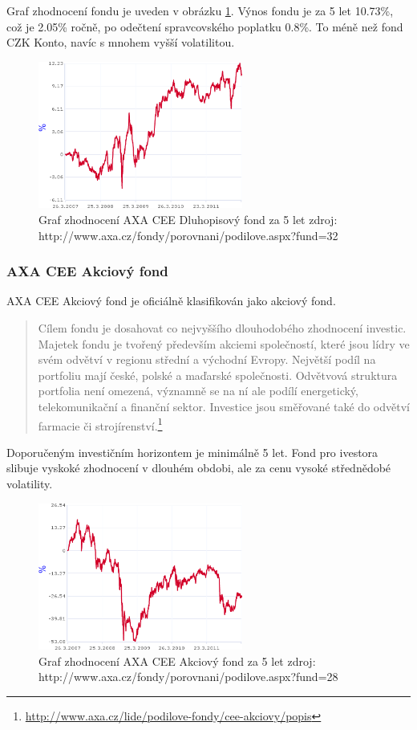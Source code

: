 \documentclass[a4paper,12pt]{article}
\begin{document}
			Graf zhodnocení fondu je uveden v obrázku \ref{axa_cee_dluh}. Výnos fondu je za 5 let 10.73\%, což je 2.05\% ročně, po odečtení spravcovského poplatku 0.8\%. To méně než fond CZK Konto, navíc s mnohem vyšší volatilitou.
			
			\begin{figure}[h!]
				\label{axa_cee_dluh}

		  	\centering
				\includegraphics[width=0.6\textwidth]{axa_cee_dluh.png}			
				\caption{Graf zhodnocení AXA CEE Dluhopisový fond za 5 let zdroj: http://www.axa.cz/fondy/porovnani/podilove.aspx?fund=32}
			\end{figure}
		\subsubsection{AXA CEE Akciový fond}
			AXA CEE Akciový fond je oficiálně klasifikován jako akciový fond.
			\begin{quote}
				Cílem fondu je dosahovat co nejvyššího dlouhodobého zhodnocení investic. Majetek fondu je tvořený především akciemi společností, které jsou lídry ve svém odvětví v regionu střední a východní Evropy. Největší podíl na portfoliu mají české, polské a maďarské společnosti. Odvětvová struktura portfolia není omezená, významně se na ní ale podílí energetický, telekomunikační a finanční sektor. Investice jsou směřované také do odvětví farmacie či strojírenství.\footnote{\url{http://www.axa.cz/lide/podilove-fondy/cee-akciovy/popis}}
			\end{quote}
			
			Doporučeným investičním horizontem je minimálně 5 let. Fond pro ivestora slibuje vyskoké zhodnocení v dlouhém obdobi, ale za cenu vysoké střednědobé volatility.
			
			\begin{figure}[h!]
				\label{axa_cee_akc}

		  	\centering
				\includegraphics[width=0.6\textwidth]{axa_cee_akc.png}			
				\caption{Graf zhodnocení AXA CEE Akciový fond za 5 let zdroj: http://www.axa.cz/fondy/porovnani/podilove.aspx?fund=28}
			\end{figure}
\end{document}

